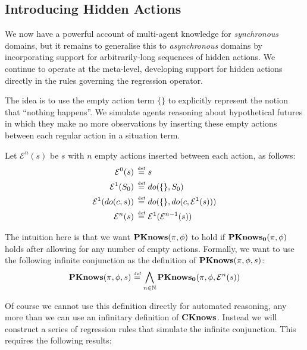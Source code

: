 \subsection{Introducing Hidden Actions\label{sub:Introducing-Hidden-Actions}}

We now have a powerful account of multi-agent knowledge for \emph{synchronous}
domains, but it remains to generalise this to \emph{asynchronous}
domains by incorporating support for arbitrarily-long sequences of
hidden actions. We continue to operate at the meta-level, developing
support for hidden actions directly in the rules governing the regression
operator.

The idea is to use the empty action term $\{\}$ to explicitly represent
the notion that {}``nothing happens''. We simulate agents reasoning
about hypothetical futures in which they make no more observations
by inserting these empty actions between each regular action in a
situation term.

\begin{defn}
Let $\mathcal{E}^{n}(s)$ be $s$ with $n$ empty actions inserted
between each action, as follows:\begin{align*}
\mathcal{E}^{0}(s)\,\stackrel{\mbox{\tiny def}}{=}\,\, & s\\
\mathcal{E}^{1}(S_{0})\,\stackrel{\mbox{\tiny def}}{=}\,\, & do(\{\},S_{0})\\
\mathcal{E}^{1}(do(c,s))\,\stackrel{\mbox{\tiny def}}{=}\,\, & do(\{\},do(c,\mathcal{E}^{1}(s)))\\
\mathcal{E}^{n}(s)\,\stackrel{\mbox{\tiny def}}{=}\,\, & \mathcal{E}^{1}(\mathcal{E}^{n-1}(s))\end{align*}

\end{defn}
The intuition here is that we want $\mathbf{PKnows}(\pi,\phi)$ to hold if
$\mathbf{PKnows_{0}}(\pi,\phi)$ holds after allowing for any number of empty
actions. Formally, we want to use the following infinite conjunction
as the definition of $\mathbf{PKnows}(\pi,\phi,s)$:\[
\mathbf{PKnows}(\pi,\phi,s)\stackrel{\mbox{\tiny def}}{=}\bigwedge_{n\in\mathbb{N}}\mathbf{PKnows_{0}}(\pi,\phi,\mathcal{E}^{n}(s))\]


Of course we cannot use this definition directly for automated reasoning,
any more than we can use an infinitary definition of $\mathbf{CKnows}$. Instead
we will construct a series of regression rules that simulate the infinite
conjunction. This requires the following results: 

